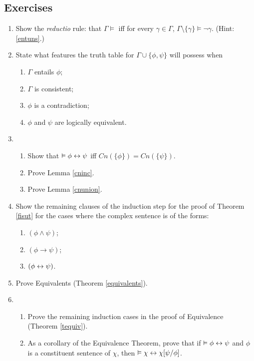 {\small


\subsection*{Exercises} \label{ex:l1semantics}


\begin{enumerate}
	\item Show the \emph{reductio} rule: that $\Gamma \vDash$ iff  for every $\gamma \in \Gamma$, $\Gamma\setminus\{\gamma\} \vDash ¬\gamma$. (Hint: \autoref{entuns}.)

	\item State what features the truth table for $\Gamma \cup \{\phi,\psi\}$ will possess when \begin{enumerate}
		\item $\Gamma$ entails $\phi$;
		\item $\Gamma$ is consistent;
		\item $\phi$ is a contradiction;
		\item $\phi$ and $\psi$ are logically equivalent.
	\end{enumerate}
	
\item \begin{enumerate}
	\item Show that $\vDash \phi \leftrightarrow \psi$ iff $Cn(\{\phi\})=Cn(\{\psi\})$.
	\item Prove Lemma \ref{cninc}.
	\item Prove Lemma \ref{cnunion}.
\end{enumerate}

\item Show the remaining clauses of the induction step for the proof of Theorem \ref{fisut} for the cases where the complex sentence is of the forms: \begin{enumerate}
	\item $(\phi \wedge \psi)$;
	\item $(\phi \to \psi)$;
	\item $(\phi \leftrightarrow \psi)$.
\end{enumerate}



\item Prove Equivalents (Theorem \ref{equivalents}).



\item \begin{enumerate}
	\item Prove the remaining induction cases in the proof of Equivalence (Theorem \ref{tequiv}).
	\item As a corollary of the Equivalence Theorem, prove that if $\vDash \phi\leftrightarrow\psi$ and $\phi$ is a constituent sentence of $\chi$, then $\vDash \chi \leftrightarrow \chi[\psi/\phi]$.
\end{enumerate}


\end{enumerate}}
